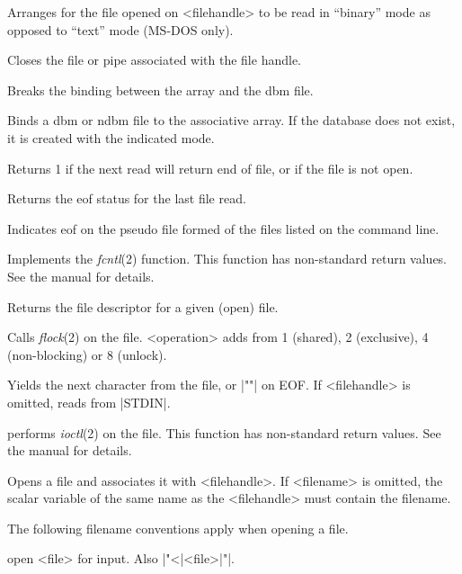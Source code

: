 \begin{enum}{1cm}

Arranges for the file opened on <filehandle> to be read in ``binary''
mode as opposed to ``text'' mode (MS-DOS only). 

Closes the file or pipe associated with the file handle.

Breaks the binding between the array and the dbm file.

Binds a dbm or ndbm file to the associative array. If the database
does not exist, it is created with the indicated mode. 

Returns 1 if the next read will return end of file, or if the file is
not open. 

Returns the eof status for the last file read.

Indicates eof on the pseudo file formed of the files listed on the
command line. 

Implements the {\it fcntl\/}(2) function. This function has non-standard
return values. See the manual for details. 

Returns the file descriptor for a given (open) file.

Calls {\it flock\/}(2) on the file. <operation> adds from 1 (shared), 2
(exclusive), 4 (non-blocking) or 8 (unlock). 


Yields the next character from the file, or |""| on EOF. If
<filehandle> is omitted, reads from |STDIN|. 

performs {\it ioctl}(2) on the file. This function has non-standard
return values. See the manual for details. 

Opens a file and associates it with <filehandle>. If <filename> is
omitted, the scalar variable of the same name as the <filehandle> must
contain the filename.

The following filename conventions apply when opening a file.

\begin{enum}{2cm}
 open <file> for input. Also |"<|<file>|"|.


\end{enum}
\end{enum}
